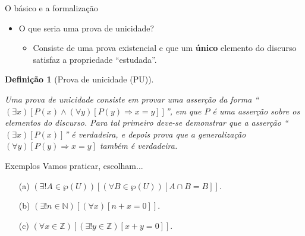 \documentclass[aspectratio=169]{beamer}
\newtheorem{defi}{Definição}
\begin{document}
	\begin{frame}{O básico e a formalização}
		\begin{itemize}
			\item O que seria uma prova de unicidade?\pause
			\begin{itemize}
				\item Consiste de uma prova existencial e que um \textbf{único} elemento do discurso satisfaz a propriedade ``estudada''.
			\end{itemize} 
		\end{itemize}
		\pause
		\begin{defi}[Prova de unicidade (PU)]\label{def:ProvaUnicidade}
			
			Uma prova de unicidade consiste em provar uma asserção da forma ``$(\exists x)[P(x) \land (\forall y)[P(y) \Rightarrow x = y]]$'', em que $P$ é uma asserção sobre os elementos do discurso. Para tal primeiro deve-se demonstrar que a asserção ``$(\exists x)[P(x)]$'' é verdadeira, e depois prova que a generalização $(\forall y)[P(y) \Rightarrow x = y]$ também é verdadeira.
		\end{defi}
	\end{frame}

	\begin{frame}{Exemplos}
		Vamos praticar, escolham...
		\begin{itemize}
			\item[(a)] $(\exists! A \in \wp(U))[(\forall B \in \wp(U))[A \cap B = B]]$.
			\item[(b)] $(\exists! n \in \mathbb{N})[(\forall x)[n + x = 0]]$.
			\item[(c)] $(\forall x \in \mathbb{Z})[(\exists! y \in \mathbb{Z})[x + y = 0]]$.
		\end{itemize}
	\end{frame}
	
\end{document}
